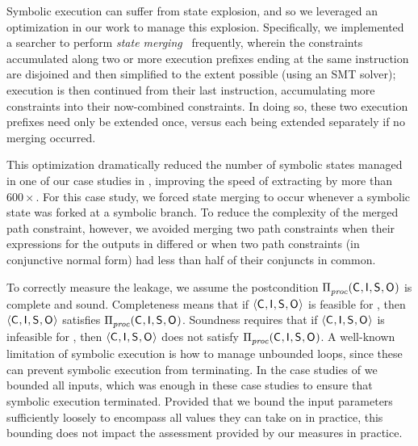 Symbolic execution can suffer from state explosion, and so we
leveraged an optimization in our work to manage this explosion.
Specifically, we implemented a searcher to perform \textit{state merging}~\cite{Kuznetsov:2012:ESM} frequently,
wherein the constraints accumulated along two or more execution
prefixes ending at the same instruction are disjoined and then
simplified to the extent possible (using an SMT solver); execution is
then continued from their last instruction, accumulating more
constraints into their now-combined constraints.  In doing so, these
two execution prefixes need only be extended once, versus each being
extended separately if no merging occurred.

This optimization dramatically reduced the number of symbolic states
managed in one of our case studies in , improving the speed
of extracting \postcondition{\proc}{} by more than $600\times$.  For
this case study, we forced state merging to occur whenever a symbolic
state was forked at a symbolic branch.  To reduce the complexity of
the merged path constraint, however, we avoided merging two path
constraints when their expressions for the outputs in \AOOFn{}
differed or when two path constraints (in conjunctive normal form) had
less than half of their conjuncts in common.

To correctly measure the leakage, we assume the postcondition
$\Pi_{\mathit{proc}}^{}(\mathsf{C}_{}, \mathsf{I}_{}, \mathsf{S}_{}, \mathsf{O}_{})$ is
complete and sound.  Completeness means that if $\langle \mathsf{C}_{},
\mathsf{I}_{}, \mathsf{S}_{}, \mathsf{O}_{}\rangle$ is feasible for \proc, then
$\langle \mathsf{C}_{}, \mathsf{I}_{}, \mathsf{S}_{}, \mathsf{O}_{}\rangle$ satisfies
$\Pi_{\mathit{proc}}^{}(\mathsf{C}_{}, \mathsf{I}_{}, \mathsf{S}_{}, \mathsf{O}_{})$.
Soundness requires that if $\langle \mathsf{C}_{}, \mathsf{I}_{}, \mathsf{S}_{},
\mathsf{O}_{}\rangle$ is infeasible for \proc, then $\langle \mathsf{C}_{},
\mathsf{I}_{}, \mathsf{S}_{}, \mathsf{O}_{}\rangle$ does not satisfy
$\Pi_{\mathit{proc}}^{}(\mathsf{C}_{}, \mathsf{I}_{}, \mathsf{S}_{}, \mathsf{O}_{})$.  A
well-known limitation of symbolic execution is how to manage unbounded
loops, since these can prevent symbolic execution from terminating.
In the case studies of  we bounded all
inputs, which was enough in these case studies to ensure that symbolic
execution terminated.  Provided that we bound the input parameters
sufficiently loosely to encompass all values they can take on in
practice, this bounding does not impact the assessment provided by our
measures in practice.

